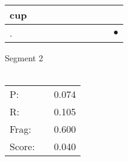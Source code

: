 \documentclass[landscape]{article}
\newcommand{\ssp}{\hspace{2pt}}
\newcommand{\mex}{\cellcolor{g}$\bullet$}
\begin{document}
\begin{tabular}{|l|p{10pt}|p{10pt}|p{10pt}|p{10pt}|p{10pt}|p{10pt}|p{10pt}|p{10pt}|p{10pt}|}
\hline
\ssp cup \ssp&\hspace{2pt}&\hspace{2pt}&\hspace{2pt}&\hspace{2pt}&\hspace{2pt}&\hspace{2pt}&\hspace{2pt}&\hspace{2pt}&\hspace{2pt}\\
\hline
\ssp \cellcolor{ref8}. \ssp&\hspace{2pt}&\hspace{2pt}&\hspace{2pt}&\hspace{2pt}&\hspace{2pt}&\hspace{2pt}&\hspace{2pt}&\hspace{2pt}&\hspace{2pt}\mex\\
\hline
\end{tabular}

\vspace{6pt}
\noindent Segment 2\\\\
\noindent\begin{tabular}{lm{12pt}r}
\hline
P:&&0.074\\
R:&&0.105\\
Frag:&&0.600\\
Score:&&0.040\\
\end{tabular}

\newpage
\end{document}
